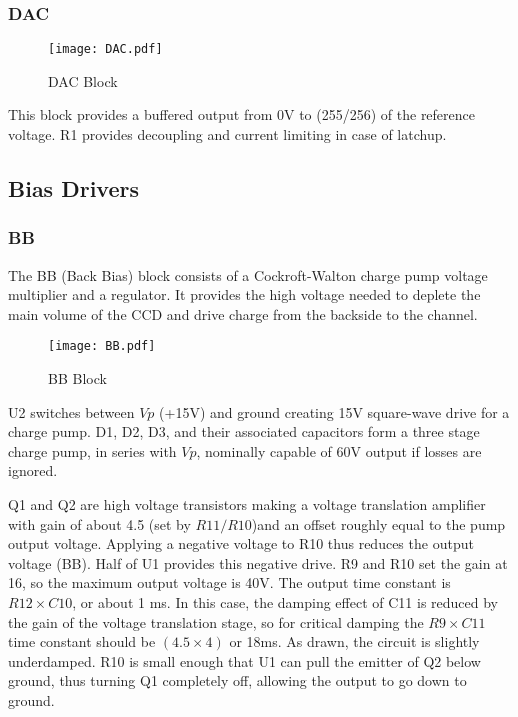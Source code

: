 \subsubsection{DAC}

   \begin{figure}
   \begin{center}
   \texttt{[image: DAC.pdf]}
   \end{center}
   \caption{DAC Block}
   \end{figure}
This block provides a buffered output from 0V to (255/256) of the reference voltage. R1 provides decoupling and current limiting in case of latchup.

\subsection{Bias Drivers}
\subsubsection{BB}

The BB (Back Bias) block consists of a Cockroft-Walton charge pump voltage multiplier and a regulator. It provides the high voltage needed to deplete the main volume of the CCD and drive charge from the backside to the channel.

   \begin{figure}
   \begin{center}
   \texttt{[image: BB.pdf]}
   \end{center}
   \caption{BB Block}
   \end{figure}

U2 switches between $Vp$ (+15V) and ground creating 15V square-wave drive for a charge pump. D1, D2, D3, and their associated capacitors form a three stage charge pump, in series with $Vp$, nominally capable of 60V output if losses are ignored. 

Q1 and Q2 are high voltage transistors making a voltage translation amplifier with gain of about 4.5 (set by $R11/R10$)and an offset roughly equal to the pump output voltage. Applying a negative voltage to R10 thus reduces the output voltage (BB). Half of U1 provides this negative drive. R9 and R10 set the gain at 16, so the maximum output voltage is 40V. The output time constant is $R12\times C10$, or about 1 ms. In this case, the damping effect of C11 is reduced by the gain of the voltage translation stage, so for critical damping the $R9\times C11$ time constant should be $(4.5\times4)$ or 18ms. As drawn, the circuit is slightly underdamped. R10 is small enough that U1 can pull the emitter of Q2 below ground, thus turning Q1 completely off, allowing the output to go down to ground.

